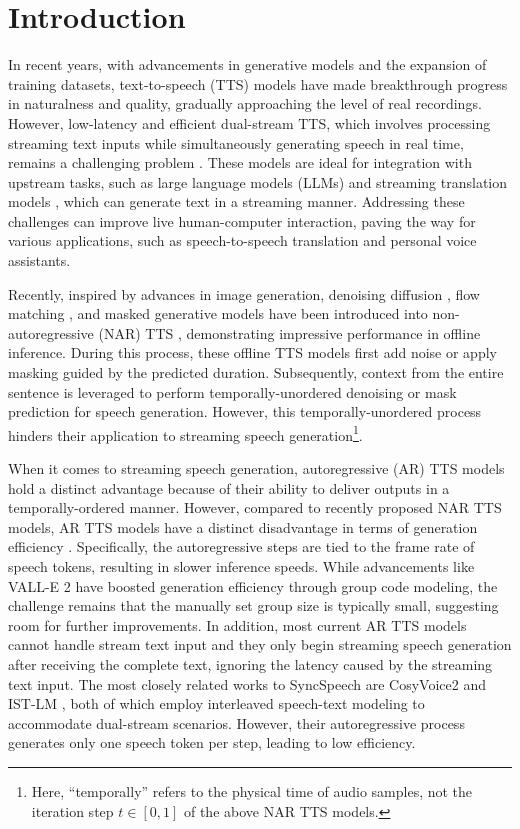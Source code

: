 \section{Introduction}

In recent years, with advancements in generative models and the expansion of training datasets, text-to-speech (TTS) models \cite{valle, voicebox, ns3} have made breakthrough progress in naturalness and quality, gradually approaching the level of real recordings. However, low-latency and efficient dual-stream TTS, which involves processing streaming text inputs while simultaneously generating speech in real time, remains a challenging problem \cite{livespeech2}. These models are ideal for integration with upstream tasks, such as large language models (LLMs) \cite{gpt4} and streaming translation models \cite{seamless}, which can generate text in a streaming manner. Addressing these challenges can improve live human-computer interaction, paving the way for various applications, such as speech-to-speech translation and personal voice assistants.

Recently, inspired by advances in image generation, denoising diffusion \cite{diffusion, score}, flow matching \cite{fm}, and masked generative models \cite{maskgit} have been introduced into non-autoregressive (NAR) TTS \cite{seedtts, F5tts, pflow, maskgct}, demonstrating impressive performance in offline inference.  During this process, these offline TTS models first add noise or apply masking guided by the predicted duration. Subsequently, context from the entire sentence is leveraged to perform temporally-unordered denoising or mask prediction for speech generation. However, this temporally-unordered process hinders their application to streaming speech generation\footnote{
Here, “temporally” refers to the physical time of audio samples, not the iteration step $t \in [0, 1]$ of the above NAR TTS models.}.


When it comes to streaming speech generation, autoregressive (AR) TTS models \cite{valle, ellav} hold a distinct advantage because of their ability to deliver outputs in a temporally-ordered manner. However, compared to recently proposed NAR TTS models,  AR TTS models have a distinct disadvantage in terms of generation efficiency \cite{MEDUSA}. Specifically, the autoregressive steps are tied to the frame rate of speech tokens, resulting in slower inference speeds.  
While advancements like VALL-E 2 \cite{valle2} have boosted generation efficiency through group code modeling, the challenge remains that the manually set group size is typically small, suggesting room for further improvements. In addition,  most current AR TTS models \cite{dualsteam1} cannot handle stream text input and they only begin streaming speech generation after receiving the complete text,  ignoring the latency caused by the streaming text input. The most closely related works to SyncSpeech are CosyVoice2 \cite{cosyvoice2.0} and IST-LM \cite{yang2024interleaved}, both of which employ interleaved speech-text modeling to accommodate dual-stream scenarios. However, their autoregressive process generates only one speech token per step, leading to low efficiency.



